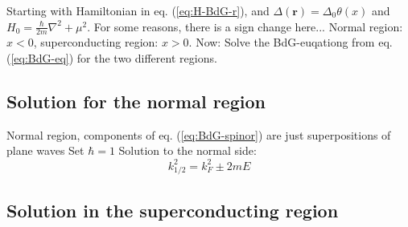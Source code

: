 Starting with Hamiltonian in eq. (\ref{eq:H-BdG-r}), and $\Delta \left( \mathbf{r} \right) = \Delta_0 \theta \left( x\right)$ and $H_0 = \frac{\hbar}{2m} \nabla^2 + \mu^2$. For some reasons, there is a sign change here...
Normal region: $x < 0$, superconducting region: $x > 0 $.
Now: Solve the BdG-euqationg from eq. (\ref{eq:BdG-eq}) for the two different regions.

\subsection*{Solution for the normal region}
Normal region, components of eq. (\ref{eq:BdG-spinor}) are just superpositions of plane waves
Set $\hbar = 1$
Solution to the normal side:
\begin{equation}
k_{1/2}^2 = k_F^2 \pm 2mE
\end{equation}

\subsection*{Solution in the superconducting region}

